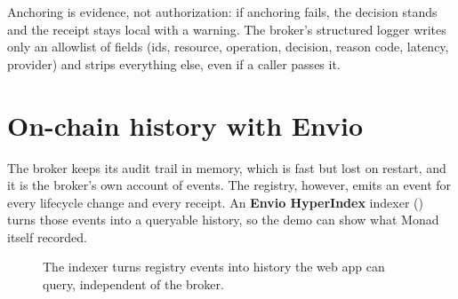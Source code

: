 \documentclass[11pt,a4paper]{article}
\begin{document}
Anchoring is evidence, not authorization: if anchoring fails, the decision stands and the receipt stays local with a warning. The broker's structured logger writes only an allowlist of fields (ids, resource, operation, decision, reason code, latency, provider) and strips everything else, even if a caller passes it.

\section{On-chain history with Envio}\label{sec:envio}

The broker keeps its audit trail in memory, which is fast but lost on restart, and it is the broker's own account of events. The registry, however, emits an event for every lifecycle change and every receipt. An \textbf{Envio HyperIndex} indexer () turns those events into a queryable history, so the demo can show what Monad itself recorded.

\begin{figure}[ht]
\centering
{}
\caption{The indexer turns registry events into history the web app can query, independent of the broker.}
\label{fig:envio}
\end{figure}
\end{document}
